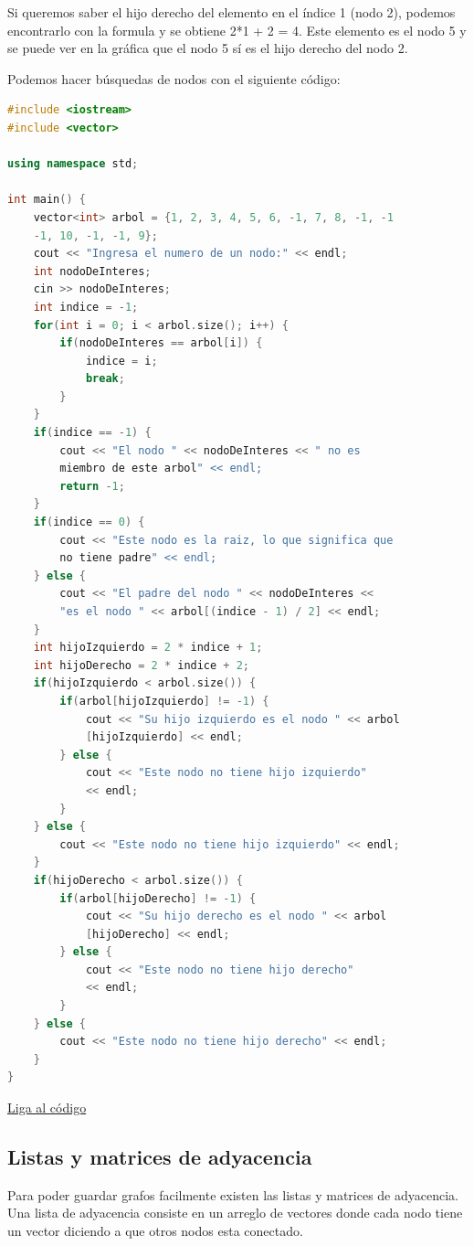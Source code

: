 \documentclass{article}
\begin{document}
Si queremos saber el hijo derecho del elemento en el índice 1 (nodo 2), podemos encontrarlo con la formula y se obtiene 2*1 + 2 = 4. Este elemento es el nodo 5 y se puede ver en la gráfica que el nodo 5 sí es el hijo derecho del nodo 2.

Podemos hacer búsquedas de nodos con el siguiente código:

\begin{lstlisting}[language=C++, caption=Arbol de binario]
#include <iostream>
#include <vector>

using namespace std;

int main() {
    vector<int> arbol = {1, 2, 3, 4, 5, 6, -1, 7, 8, -1, -1
    -1, 10, -1, -1, 9};
    cout << "Ingresa el numero de un nodo:" << endl;
    int nodoDeInteres;
    cin >> nodoDeInteres;
    int indice = -1;
    for(int i = 0; i < arbol.size(); i++) {
        if(nodoDeInteres == arbol[i]) {
            indice = i;
            break;
        }
    }
    if(indice == -1) {
        cout << "El nodo " << nodoDeInteres << " no es
        miembro de este arbol" << endl;
        return -1;
    }
    if(indice == 0) {
        cout << "Este nodo es la raiz, lo que significa que
        no tiene padre" << endl;
    } else {
        cout << "El padre del nodo " << nodoDeInteres <<
        "es el nodo " << arbol[(indice - 1) / 2] << endl;
    }
    int hijoIzquierdo = 2 * indice + 1;
    int hijoDerecho = 2 * indice + 2;
    if(hijoIzquierdo < arbol.size()) {
        if(arbol[hijoIzquierdo] != -1) {
            cout << "Su hijo izquierdo es el nodo " << arbol
            [hijoIzquierdo] << endl;
        } else {
            cout << "Este nodo no tiene hijo izquierdo"
            << endl;
        }
    } else {
        cout << "Este nodo no tiene hijo izquierdo" << endl;
    }
    if(hijoDerecho < arbol.size()) {
        if(arbol[hijoDerecho] != -1) {
            cout << "Su hijo derecho es el nodo " << arbol
            [hijoDerecho] << endl;
        } else {
            cout << "Este nodo no tiene hijo derecho"
            << endl;
        }
    } else {
        cout << "Este nodo no tiene hijo derecho" << endl;
    }
}
\end{lstlisting}
\href{https://repl.it/@Jamesscn/Arboles-Binarios}{Liga al código}

\subsection{Listas y matrices de adyacencia}

Para poder guardar grafos facilmente existen las listas y matrices de adyacencia. Una lista de adyacencia consiste en un arreglo de vectores donde cada nodo tiene un vector diciendo a que otros nodos esta conectado.
\end{document}

